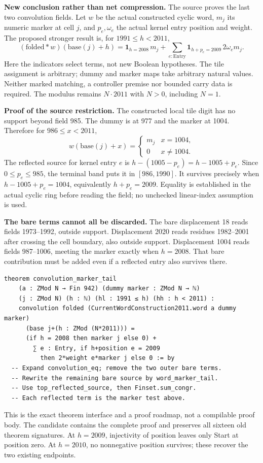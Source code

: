 \textbf{New conclusion rather than net compression.} The source  proves the last two convolution fields. Let \(w\) be the actual constructed cyclic word, \(m_j\) its numeric marker at cell \(j\), and \(p_e,\omega_e\) the actual kernel entry position and weight. The proposed stronger result is, for \(1991\le h<2011\),
\[
 (\mathrm{folded}*w)(\mathrm{base}(j)+h)
 =\mathbf1_{h=2008}\,m_j+
   \sum_{e:\mathrm{Entry}}\mathbf1_{h+p_e=2009}\,2\omega_e m_j.
\]
Here the indicators select terms, not new Boolean hypotheses. The tile assignment is arbitrary; dummy and marker maps take arbitrary natural values. Neither marked matching, a controller premise nor bounded carry data is required. The modulus remains \(N\cdot2011\) with \(N>0\), including \(N=1\).

\textbf{Proof of the source restriction.} The constructed local tile digit has no support beyond field 985. The dummy is at 977 and the marker at 1004. Therefore for \(986\le x<2011\),
\[
 w(\mathrm{base}(j)+x)=
 \begin{cases}m_j&x=1004,\\0&x\ne1004.\end{cases}
\]
The reflected source for kernel entry \(e\) is \(h-(1005-p_e)=h-1005+p_e\). Since \(0\le p_e\le985\), the terminal band puts it in \([986,1990]\). It survives precisely when \(h-1005+p_e=1004\), equivalently \(h+p_e=2009\). Equality is established in the actual cyclic ring before reading the field; no unchecked linear-index assumption is used.

\textbf{The bare terms cannot all be discarded.} The bare displacement 18 reads fields 1973--1992, outside support. Displacement 2020 reads residues 1982--2001 after crossing the cell boundary, also outside support. Displacement 1004 reads fields 987--1006, meeting the marker exactly when \(h=2008\). That bare contribution must be added even if a reflected entry also survives there.

\begin{lstlisting}
theorem convolution_marker_tail
    (a : ZMod N → Fin 942) (dummy marker : ZMod N → ℕ)
    (j : ZMod N) (h : ℕ) (hl : 1991 ≤ h) (hh : h < 2011) :
    convolution folded (CurrentWordConstruction2011.word a dummy marker)
      (base j+(h : ZMod (N*2011))) =
      (if h = 2008 then marker j else 0) +
        ∑ e : Entry, if h+position e = 2009
          then 2*weight e*marker j else 0 := by
  -- Expand convolution_eq; remove the two outer bare terms.
  -- Rewrite the remaining bare source by word_marker_tail.
  -- Use top_reflected_source, then Finset.sum_congr.
  -- Each reflected term is the marker test above.
\end{lstlisting}
This is the exact theorem interface and a proof roadmap, not a compilable proof body. The candidate contains the complete proof and preserves all sixteen old theorem signatures. At \(h=2009\), injectivity of position leaves only Start at position zero. At \(h=2010\), no nonnegative position survives; these recover the two existing endpoints.

